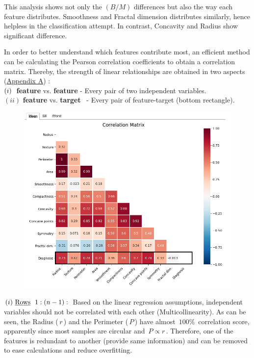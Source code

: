 \documentclass[12pt]{article}
\newcommand\tab[1][1cm]{\hspace*{#1}}
\numberwithin{equation}{section}
\begin{document}
\begin{flushleft}
This analysis shows not only the $(B/M)$ differences but also the way each feature distributes. Smoothness and Fractal dimension distributes similarly, hence helpless in the classification attempt. In contrast, Concavity and Radius show significant difference.

In order to better understand which features contribute most, an efficient method can be calculating the Pearson correlation coefficients to obtain a correlation matrix. Thereby, the strength of linear relationships are obtained in two aspects (\hyperlink{corr_mat}{Appendix A}) : \\[3mm]
\tab $(i) \hspace{1mm} $ \textbf{feature} vs. \textbf{feature} - Every pair of two independent variables. \\
\tab  $(ii)$ \textbf{feature} vs. \textbf{target} \ - Every pair of feature-target (bottom rectangle).

\begin{figure}[H]
\centering
\includegraphics[width=0.935\linewidth, center]{Corr_mean.png}
\end{figure}
$(i) \ \text{\underline{Rows} }  \ 1 : (n-1) : \,$ Based on the linear regression assumptions, independent variables should not be correlated with each other (Multicollinearity). As can be seen, the Radius ($\, r \,$) and the Perimeter ($\, P\, $) have almost $\, 100 \% \,$ correlation score, apparently since most samples are circular and $\,P \propto r \,$. Therefore, one of the features is redundant to another (provide same information) and can be removed to ease calculations and reduce overfitting.


\end{flushleft}
\end{document}
